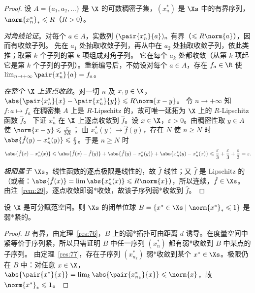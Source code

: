 \begin{proof}
设 $A=\{a_1,a_2,\dots\}$ 是 $\X$ 的可数稠密子集，$(x^*_n)$ 是 $\Xs$ 中的有界序列，$\norm{x^*_n}_*\leqslant R$（$R>0$）。

\emph{对角线论证}。对每个 $a\in A$，实数列 $(\pair{x^*_n}{a})_n$ 有界（$\leqslant R\norm{a}$），因而有收敛子列。
先在 $a_1$ 处抽取收敛子列，再从中在 $a_2$ 处抽取收敛子列，依此类推；取第 $k$ 个子列的第 $k$ 项组成对角子列。
它在每个 $a_k$ 处都收敛（从第 $k$ 项起它是第 $k$ 个子列的子列）。重新编号后，不妨设对每个 $a\in A$，存在 $f_a\in\R$ 使
$\lim_{n\to+\infty}\pair{x^*_n}{a}=f_a$。

\emph{在整个 $\X$ 上逐点收敛}。对一切 $n$ 及 $x,y\in\X$，$\abs{\pair{x^*_n}{x}-\pair{x^*_n}{y}}\leqslant R\norm{x-y}$。
令 $n\to+\infty$ 知 $f:a\mapsto f_a$ 在稠密集 $A$ 上是 $R$-Lipschitz 的，故可唯一延拓为 $\X$ 上的 $R$-Lipschitz 函数 $\hat f$。
下证 $x^*_n$ 在 $\X$ 上逐点收敛到 $\hat f$。设 $x\in\X$，$\varepsilon>0$。由稠密性取 $y\in A$ 使 $\norm{x-y}\leqslant\frac{\varepsilon}{3R}$；
由 $x^*_n(y)\to\hat f(y)$，存在 $N$ 使 $n\geqslant N$ 时 $\abs{\hat f(y)-x^*_n(y)}\leqslant\frac{\varepsilon}{3}$。于是 $n\geqslant N$ 时
\[
  \abs{\hat f(x)-x^*_n(x)}\leqslant\abs{\hat f(x)-\hat f(y)}+\abs{\hat f(y)-x^*_n(y)}+\abs{x^*_n(y)-x^*_n(x)}\leqslant\frac\varepsilon3+\frac\varepsilon3+\frac\varepsilon3=\varepsilon .
\]

\emph{极限属于 $\Xs$}。线性函数的逐点极限是线性的，故 $\hat f$ 线性；又 $\hat f$ 是 Lipschitz 的（或者：$\abs{\hat f(x)}=\lim\abs{x^*_n(x)}\leqslant R\norm{x}$），所以连续，$\hat f\in\Xs$。
由注~\ref{rem:29}，逐点收敛即弱*收敛，故该子序列弱*收敛到 $\hat f$。
\end{proof}

\begin{theorem}
\label{res:78}
设 $\X$ 是可分赋范空间。则 $\Xs$ 的闭单位球 $B=\{x^*\in\Xs\mid\norm{x^*}_*\leqslant1\}$ 是弱*紧的。
\end{theorem}

\begin{proof}
$B$ 有界，由定理~\ref{res:76}，$B$ 上的弱*拓扑可由距离 $d$ 诱导。在度量空间中紧等价于序列紧，所以只需证明 $B$ 中任一序列 $(x^*_n)$ 都有弱*收敛到 $B$ 中某点的子序列。
由定理~\ref{res:77}，存在子序列 $(x^*_{n_k})$ 弱*收敛到某个 $x^*\in\Xs$。极限仍在 $B$ 中：对任意 $x\in\X$，
$\abs{\pair{x^*}{x}}=\lim_k\abs{\pair{x^*_{n_k}}{x}}\leqslant\norm{x}$，故 $\norm{x^*}_*\leqslant1$。
\end{proof}

